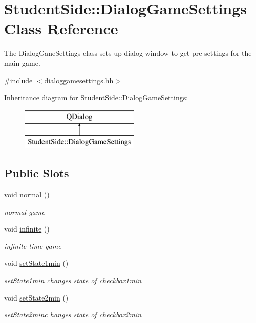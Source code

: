 \hypertarget{class_student_side_1_1_dialog_game_settings}{\section{Student\-Side\-:\-:Dialog\-Game\-Settings Class Reference}
\label{class_student_side_1_1_dialog_game_settings}
}


The Dialog\-Gane\-Settings class sets up dialog window to get pre settings for the main game.  




{\ttfamily \#include $<$dialoggamesettings.\-hh$>$}

Inheritance diagram for Student\-Side\-:\-:Dialog\-Game\-Settings\-:\begin{figure}[H]
\begin{center}
\leavevmode
\includegraphics[height=2.000000cm]{class_student_side_1_1_dialog_game_settings}
\end{center}
\end{figure}
\subsection*{Public Slots}
\begin{DoxyCompactItemize}
\item 
void \hyperlink{class_student_side_1_1_dialog_game_settings_a9ee703736f4cde7137c785f00b0bc4d9}{normal} ()
\begin{DoxyCompactList}\small\item\em normal game \end{DoxyCompactList}\item 
void \hyperlink{class_student_side_1_1_dialog_game_settings_adce8f9e27b998911d35526350932c95a}{infinite} ()
\begin{DoxyCompactList}\small\item\em infinite time game \end{DoxyCompactList}\item 
void \hyperlink{class_student_side_1_1_dialog_game_settings_a1af75c606fddb4f29189c5cb65a4aa32}{set\-State1min} ()
\begin{DoxyCompactList}\small\item\em set\-State1min changes state of checkbox1min \end{DoxyCompactList}\item 
void \hyperlink{class_student_side_1_1_dialog_game_settings_ad8ddebcb7566ee6ee9abe7463659ce0b}{set\-State2min} ()
\begin{DoxyCompactList}\small\item\em set\-State2minc hanges state of checkbox2min \end{DoxyCompactList}\end{DoxyCompactItemize}
